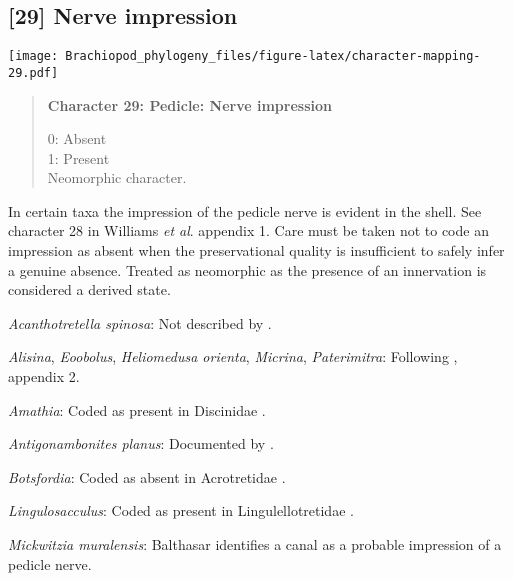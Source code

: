 \documentclass[openany]{book}
\theoremstyle{definition}
\theoremstyle{definition}
\theoremstyle{definition}
\theoremstyle{remark}
\begin{document}
\subsection*{{[}29{]} Nerve impression}\label{nerve-impression}

\texttt{[image: Brachiopod\_phylogeny\_files/figure-latex/character-mapping-29.pdf]}

\begin{quote}
\textbf{Character 29: Pedicle: Nerve impression}

0: Absent\\
1: Present\\
Neomorphic character.
\end{quote}

In certain taxa the impression of the pedicle nerve is evident in the
shell. See character 28 in Williams \emph{et al}.
\citeyearpar{Williams1998Thediversity} appendix 1. Care must be taken
not to code an impression as absent when the preservational quality is
insufficient to safely infer a genuine absence. Treated as neomorphic as
the presence of an innervation is considered a derived state.

\hypertarget{Acanthotretella_spinosa-coding-29}{}
\emph{Acanthotretella spinosa}: Not described by
\citet{Williams2000LinguliformeaCraniiformea}.

\hypertarget{Alisina-coding-29}{}
\emph{Alisina}, \emph{Eoobolus}, \emph{Heliomedusa orienta},
\emph{Micrina}, \emph{Paterimitra}: Following
\citet{Williams1998Thediversity}, appendix 2.

\hypertarget{Amathia-coding-29}{}
\emph{Amathia}: Coded as present in Discinidae \citep[table
6]{Williams2000LinguliformeaCraniiformea}.

\hypertarget{Antigonambonites_planus-coding-29}{}
\emph{Antigonambonites planus}: Documented by
\citet{Skovsted2017Depthrelated}.

\hypertarget{Botsfordia-coding-29}{}
\emph{Botsfordia}: Coded as absent in Acrotretidae \citep[table
6]{Williams2000LinguliformeaCraniiformea}.

\hypertarget{Lingulosacculus-coding-29}{}
\emph{Lingulosacculus}: Coded as present in Lingulellotretidae
\citep[table 6]{Williams2000LinguliformeaCraniiformea}.

\hypertarget{Mickwitzia_muralensis-coding-29}{}
\emph{Mickwitzia muralensis}: Balthasar
\citeyearpar[p.~274]{Balthasar2008iMummpikia} identifies a canal as a
probable impression of a pedicle nerve.
\end{document}
